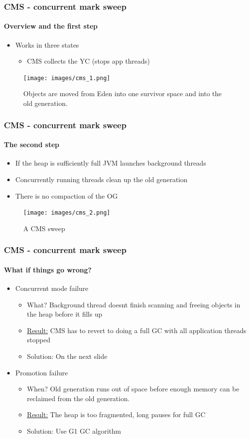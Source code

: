 \documentclass{beamer}
\begin{document}
\begin{frame}
    \frametitle{CMS - concurrent mark sweep}
    \framesubtitle{Overview and the first step }
    \begin{itemize}
        \item Works in three states
        \begin{itemize}
            \item CMS collects the YC (stops app threads)
        \end{itemize}
    \end{itemize}
    \begin{figure}
        \texttt{[image: images/cms\_1.png]}
        \caption{Objects are  moved from Eden into one survivor space and into the old generation.}
    \end{figure}
\end{frame}

\begin{frame}
    \frametitle{CMS - concurrent mark sweep}
    \framesubtitle{The second step} 
    \begin{itemize}
        \item If the heap is sufficiently full JVM launches background threads
        \item Concurrently running threads clean up the old generation
        \item There is no compaction of the OG 
    \end{itemize}
    \begin{figure}
        \texttt{[image: images/cms\_2.png]}
        \caption{A CMS sweep}
    \end{figure}
\end{frame}
\begin{frame}
    \frametitle{CMS - concurrent mark sweep}
    \framesubtitle{What if things go wrong?} 
    \begin{itemize}
        \item Concurrent mode failure
        \begin{itemize}
            \item What? Background thread doesnt finish scanning and freeing objects in the heap before it fills up
            \item \underline{Result:} CMS has to revert to doing a full GC with all application threads stopped
            \item Solution: On the next slide
        \end{itemize}
        \item Promotion failure
        \begin{itemize}
            \item When? Old generation runs out of space before enough memory can be reclaimed from the old generation.
            \item  \underline{Result:} The heap is too fragmented, long pauses for full GC 
            \item Solution: Use G1 GC algorithm
        \end{itemize}
    \end{itemize}
\end{frame}
\end{document}
